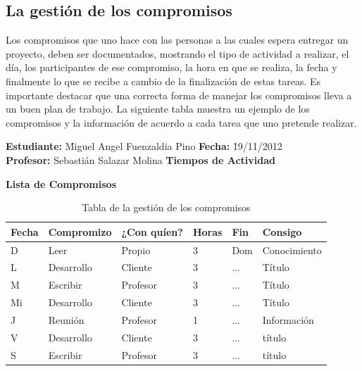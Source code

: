 \documentclass[a4paper,12pt,openany,oneside]{book}
\begin{document}
\subsection{La gestión de los compromisos}
Los compromisos que uno hace con las personas a las cuales espera entregar un proyecto, deben ser documentados, mostrando el tipo de actividad a realizar, el día, los participantes de ese compromiso, la hora en que se realiza, la fecha y finalmente lo que se recibe a cambio de la finalización de estas tareas. Es importante destacar que una correcta forma de manejar los compromisos lleva a un buen plan de trabajo. La siguiente tabla muestra un ejemplo de los compromisos y la información de acuerdo a cada tarea que uno pretende realizar.
\begin{table}
\begin{tabbing}
\textbf{Estudiante:} \= Miguel Angel Fuenzaldia Pino \= \textbf{Fecha:} \= 19/11/2012\\
\textbf{Profesor:} \> Sebastián Salazar Molina \> \textbf{Tiempos de Actividad} \>  \\
\end{tabbing}
\textbf{Lista de Compromisos}\\
\begin{tabular}{| l | l | l | l | l | l |}
\hline
\textbf{Fecha} & \textbf{Compromizo} & \textbf{¿Con quíen?} & \textbf{Horas} & \textbf{Fin} & \textbf{Consigo} \\
\hline
D  & Leer       & Propio   & 3 & Dom & Conocimiento \\
\hline
L  & Desarrollo & Cliente  & 3 & ... & Título \\
\hline
M  & Escribir   & Profesor & 3 & ... & Título \\
\hline
Mi & Desarrollo & Cliente  & 3 & ... & Título \\
\hline
J  & Reunión    & Profesor & 1 & ... & Información \\
\hline
V  & Desarrollo & Cliente  & 3 & ... & título \\
\hline
S  & Escribir   & Profesor & 3 & ... & título \\
\hline
\end{tabular}
\caption{Tabla de la gestión de los compromisos}
\end{table}
\end{document}

